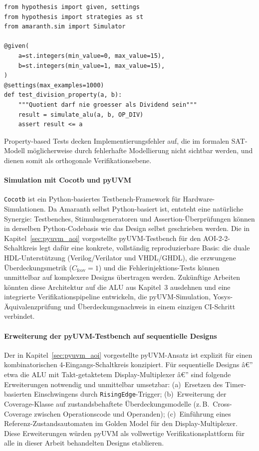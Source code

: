 ﻿\documentclass[12pt,a4paper]{report}
\begin{document}
\begin{lstlisting}[style=pythonstyle, caption={Hypothesis-basierter ALU-Test}]
from hypothesis import given, settings
from hypothesis import strategies as st
from amaranth.sim import Simulator

@given(
    a=st.integers(min_value=0, max_value=15),
    b=st.integers(min_value=1, max_value=15),
)
@settings(max_examples=1000)
def test_division_property(a, b):
    """Quotient darf nie groesser als Dividend sein"""
    result = simulate_alu(a, b, OP_DIV)
    assert result <= a
\end{lstlisting}

Property-based Tests decken Implementierungsfehler auf, die im formalen SAT-Modell
möglicherweise durch fehlerhafte Modellierung nicht sichtbar werden, und dienen somit
als orthogonale Verifikationsebene.

\paragraph{Simulation mit Cocotb und pyUVM}
\texttt{Cocotb} \cite{cocotb2024} ist ein Python-basiertes Testbench-Framework für
Hardware-Simulationen. Da Amaranth selbst Python-basiert ist, entsteht eine natürliche
Synergie: Testbenches, Stimulusgeneratoren und Assertion-Überprüfungen können in
derselben Python-Codebasis wie das Design selbst geschrieben werden. Die in
Kapitel~\ref{sec:pyuvm_aoi} vorgestellte pyUVM-Testbench für den AOI-2-2-Schaltkreis
legt dafür eine konkrete, vollständig reproduzierbare Basis: die duale
HDL-Unterstützung (Verilog/Verilator und VHDL/GHDL), die erzwungene
Überdeckungsmetrik ($C_{\mathrm{fcov}} = 1$) und die Fehlerinjektions-Tests
können unmittelbar auf komplexere Designs übertragen werden.
Zukünftige Arbeiten könnten diese Architektur auf die ALU aus Kapitel~3 ausdehnen
und eine integrierte Verifikationspipeline entwickeln, die pyUVM-Simulation,
Yosys-Äquivalenzprüfung und Überdeckungsnachweis in einem einzigen CI-Schritt
verbindet.

\paragraph{Erweiterung der pyUVM-Testbench auf sequentielle Designs}
Der in Kapitel~\ref{sec:pyuvm_aoi} vorgestellte pyUVM-Ansatz ist explizit für einen
kombinator\-ischen 4-Eingangs-Schaltkreis konzipiert. Für sequentielle Designs â€”
etwa die ALU mit Takt-getaktetem Display-Multiplexer â€” sind folgende Erweiterungen
notwendig und unmittelbar umsetzbar: (a)~Ersetzen des Timer-basierten Einschwingens
durch \texttt{RisingEdge}-Trigger; (b)~Erweiterung der Coverage-Klasse auf
zustandsbehaftete Überdeckungsmodelle (z.\,B.\ Cross-Coverage zwischen Operationscode
und Operanden); (c)~Einführung eines Referenz-Zustandsautomaten im Golden Model für
den Display-Multiplexer. Diese Erweiterungen würden pyUVM als vollwertige
Verifikationsplattform für alle in dieser Arbeit behandelten Designs etablieren.
\end{document}
